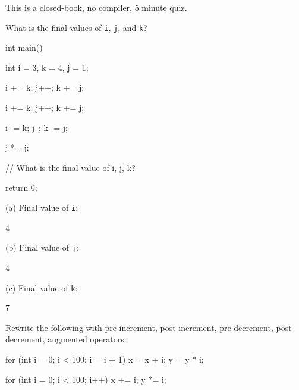 

This is a closed-book, no compiler, 5 minute quiz.

\nextq
What is the final values of \verb!i!, \verb!j!, and \verb!k!?
\begin{console}[fontsize=\footnotesize]
int main()
{
    int i = 3, k = 4, j = 1;

    i += k;
    j++;
    k += j;

    i += k;
    j++;
    k += j;

    i -= k;
    j--;
    k -= j;

    j *= j;

    // What is the final value of i, j, k?

    return 0;
}
\end{console}
(a) Final value of \verb!i!:
\\
\ANSWER
\begin{answercode}
4
\end{answercode}

(b) Final value of \verb!j!:
\\
\ANSWER
\begin{answercode}
4
\end{answercode}
(c) Final value of \verb!k!:
\\
\ANSWER
\begin{answercode}
7
\end{answercode}

\nextq
Rewrite the following with pre-increment, post-increment, pre-decrement,
post-decrement, augmented operators:
\begin{console}[fontsize=\small]
for (int i = 0; i < 100; i = i + 1)
{
    x = x + i;
    y = y * i;
}
\end{console}
\ANSWER\vspace{5pt}
\begin{answercode}[fontsize=\small]
for (int i = 0; i < 100; i++)
{
    x += i;
    y *= i;
}
\end{answercode}


